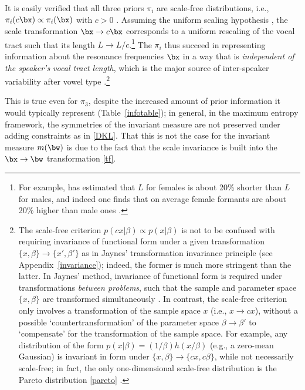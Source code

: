 \begin{chapterappendices}{6}
It is easily verified that all three priors $\pi_i$ are scale-free distributions, i.e., $\pi_i(c\bx) \propto \pi_i(\bx)$ with $c > 0$ \citep{Newman2005}. 
Assuming the uniform scaling hypothesis \citep[e.g.,][]{Fant1966}, the scale transformation $\bx \rightarrow c\bx$ corresponds to a uniform rescaling of the vocal tract such that its length $L \rightarrow L/c$.\footnote{%
For example, \citep{Goldstein1980} has estimated that $L$ for females is about 20\% shorter than $L$ for males, and indeed one finds that on average female formants are about 20\% higher than male ones \citep{Fant1966}.
}
The $\pi_i$ thus succeed in representing information about the resonance frequencies $\bx$ in a way that is \emph{independent of the speaker's vocal tract length}, which is the major source of inter-speaker variability after vowel type \citep{Turner2009}.\footnote{%
The scale-free criterion $p(cx|\beta) \propto p(x|\beta)$ is not to be confused with requiring invariance of functional form under a given transformation $\{x,\beta\} \rightarrow \{x',\beta'\}$ as in Jaynes' transformation invariance principle (see Appendix~\ref{invariance}); indeed, the former is much more stringent than the latter.
In Jaynes’ method, invariance of functional form is required under transformations \emph{between problems}, such that the sample and parameter space $\{x, \beta\}$ are transformed simultaneously \citep[App.~A]{Jaynes1989a}.
In contrast, the scale-free criterion only involves a transformation of the sample space $x$ (i.e., $x \rightarrow cx$), without a possible `countertransformation' of the parameter space $\beta \rightarrow \beta'$ to `compensate' for the transformation of the sample space.
For example, any distribution of the form $p(x|\beta) = (1/\beta) h(x/\beta)$ (e.g., a zero-mean Gaussian) is invariant in form under $\{x, \beta\} \rightarrow \{cx, c\beta\}$, while not necessarily scale-free; in fact, the only one-dimensional scale-free distribution is the Pareto distribution \eqref{pareto} \citep{Newman2005}.
}

This is true even for $\pi_3$, despite the increased amount of prior information it would typically represent (Table~\ref{infotable}); in general, in the maximum entropy framework, the symmetries of the invariant measure are not preserved under adding constraints as in \eqref{DKL}.
That this is not the case for the invariant measure $m(\bw)$ is due to the fact that the scale invariance is built into the $\bx \rightarrow \bw$ transformation \eqref{tf}.


\end{chapterappendices}
